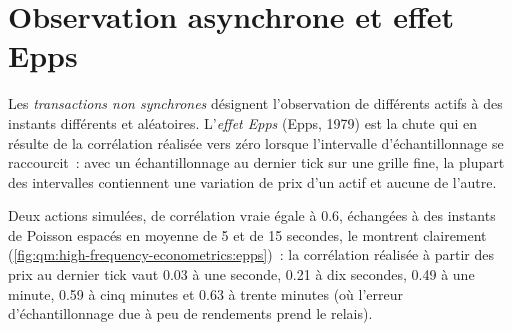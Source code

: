 \begin{omfigure}

\label{fig:qm:high-frequency-econometrics:estimators}
\end{omfigure}

\section{Observation asynchrone et effet Epps}

\begin{definition}\label{def:qm:high-frequency-econometrics:epps}
Les \emph{transactions non synchrones} désignent l'observation de différents actifs à des instants différents et aléatoires. L'\emph{effet
Epps} (Epps, 1979) est la chute qui en résulte de la corrélation réalisée vers zéro lorsque l'intervalle d'échantillonnage se raccourcit~: avec un échantillonnage au dernier tick sur une grille fine,
la plupart des intervalles contiennent une variation de prix d'un actif et aucune de l'autre.
\end{definition}

Deux actions simulées, de corrélation vraie égale à 0.6, échangées à des instants de Poisson espacés en moyenne de 5 et de 15 secondes, le montrent clairement
(\cref{fig:qm:high-frequency-econometrics:epps})~: la corrélation réalisée à partir des prix au dernier tick vaut 0.03 à une seconde, 0.21 à dix secondes, 0.49 à une minute, 0.59 à cinq
minutes et 0.63 à trente minutes (où l'erreur d'échantillonnage due à peu de rendements prend le relais).

